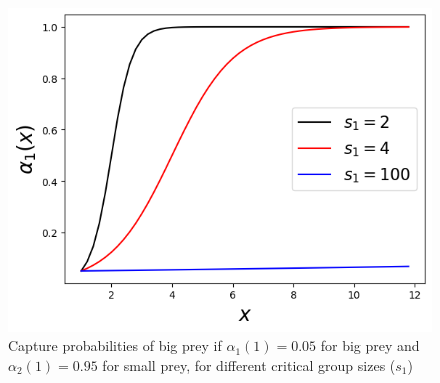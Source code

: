 \begin{figure}
\begin{center}
\includegraphics[width=.4\textwidth, trim={0 0.3cm 0 0},clip]{Figures/capturerate_bigprey.png}
\end{center}
\caption{Capture probabilities of big prey if $\alpha_1(1)= 0.05$ for big prey and $\alpha_2(1) = 0.95$ for small prey, for different critical group sizes ($s_1$)}
\label{fig_capture_rates}
\end{figure}


